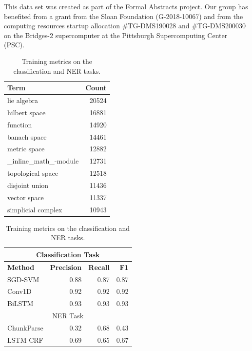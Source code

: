 \documentclass[submission,copyright,creativecommons]{eptcs}
\begin{document}
This data set was created  as part of the Formal Abstracts project.
Our group has benefited from a grant from the Sloan  Foundation
(G-2018-10067) and from the computing resources startup allocation
\mbox{\#TG-DMS190028} and \mbox{\#TG-DMS200030} on the Bridges-2
supercomputer at the Pittsburgh Supercomputing Center (PSC).
\begin{table}[h]
    \centering
    \begin{minipage}{0.45\textwidth}
    \small
\centering
\begin{tabular}{lr}
    \hline \textbf{Term} &  \textbf{Count} \\ \hline
lie algebra & 20524 \\
hilbert space & 16881 \\
function & 14920 \\
banach space & 14461 \\
metric space & 12882 \\
\_inline\_math\_-module & 12731 \\
topological space & 12518 \\
disjoint union & 11436 \\
vector space & 11337 \\
simplicial complex & 10943 \\
\hline

\end{tabular}
\caption{\label{term-cnt-tab} Most common multiword entries in the data base. }
        \end{minipage}\hfill
    \begin{minipage}{0.45\textwidth}
    \small
\centering
\begin{tabular}{lrrr}
    \hline
    \multicolumn{4}{c}{Classification Task} \\
    \hline
\textbf{Method}  & \textbf{Precision} &  \textbf{Recall} & \textbf{F1}\\ 
\hline
    SGD-SVM & 0.88 & 0.87 & 0.87 \\
    Conv1D & 0.92 & 0.92 & 0.92 \\
    BiLSTM & 0.93 & 0.93 & 0.93 \\
     \hline
    \hline
    \multicolumn{4}{c}{NER Task} \\
    \hline
    ChunkParse & 0.32 & 0.68 & 0.43 \\
    LSTM-CRF & 0.69 & 0.65 & 0.67 \\
    \hline
\end{tabular}
\caption{\label{metric-comp} Training metrics on the classification and NER tasks.}
\end{minipage}
\end{table}
\end{document}
